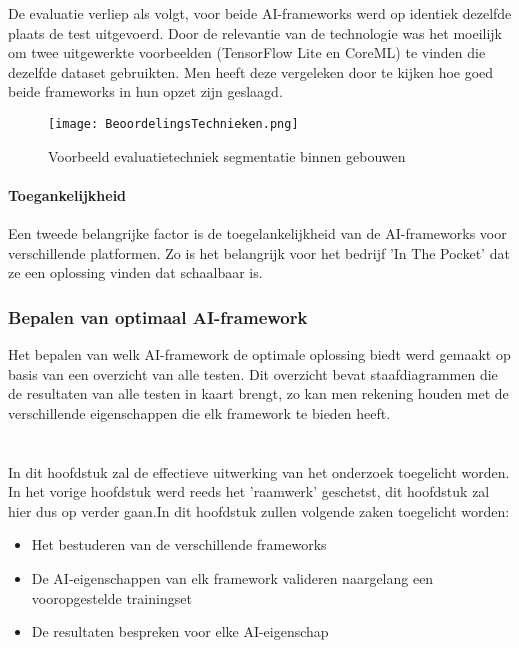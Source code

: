 De evaluatie verliep als volgt, voor beide AI-frameworks werd op identiek dezelfde plaats de test uitgevoerd. Door de relevantie van de technologie was het moeilijk om twee uitgewerkte voorbeelden (TensorFlow Lite en CoreML) te vinden die dezelfde dataset gebruikten. Men heeft deze vergeleken door te kijken hoe goed beide frameworks in hun opzet zijn geslaagd.
\begin{figure}[H]
	\centering
	\texttt{[image: BeoordelingsTechnieken.png]}
	\caption{Voorbeeld evaluatietechniek segmentatie binnen gebouwen}
\end{figure}

\subsubsection{Toegankelijkheid}
Een tweede belangrijke factor is de toegelankelijkheid van de AI-frameworks voor verschillende platformen. Zo is het belangrijk voor het bedrijf 'In The Pocket' dat ze een oplossing vinden dat schaalbaar is.

\subsection{Bepalen van optimaal AI-framework}
Het bepalen van welk AI-framework de optimale oplossing biedt werd gemaakt op basis van een overzicht van alle testen. Dit overzicht bevat staafdiagrammen die de resultaten van alle testen in kaart brengt, zo kan men rekening houden met de verschillende eigenschappen die elk framework te bieden heeft.

\chapter{}
\label{ch:onderzoek}
In dit hoofdstuk zal de effectieve uitwerking van het onderzoek toegelicht worden. In het vorige hoofdstuk werd reeds het 'raamwerk' geschetst, dit hoofdstuk zal hier dus op verder gaan.In dit hoofdstuk zullen volgende zaken toegelicht worden:

\begin{itemize}
	\item Het bestuderen van de verschillende frameworks
	\item De AI-eigenschappen van elk framework valideren naargelang een vooropgestelde trainingset
	\item De resultaten bespreken voor elke AI-eigenschap
\end{itemize}

